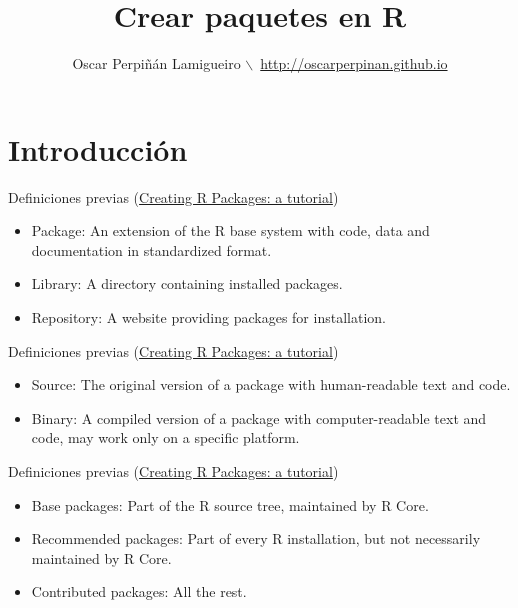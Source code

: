 \documentclass[xcolor={usenames,svgnames,dvipsnames}]{beamer}
\author{Oscar Perpiñán Lamigueiro $\backslash$\ \url{http://oscarperpinan.github.io}}
\date{}
\title{Crear paquetes en R}
\begin{document}
\maketitle


\section{Introducción}
\label{sec:org985fe1c}

\begin{frame}[label={sec:org268fdd0}]{Definiciones previas (\href{http://cran.r-project.org/doc/contrib/Leisch-CreatingPackages.pdf}{Creating R Packages: a tutorial})}
\begin{itemize}
\item \alert{Package}: An extension of the R base system with code, data and
documentation in standardized format.
\item \alert{Library}: A directory containing installed packages.
\item \alert{Repository}: A website providing packages for installation.
\end{itemize}
\end{frame}

\begin{frame}[label={sec:org938644a}]{Definiciones previas (\href{http://cran.r-project.org/doc/contrib/Leisch-CreatingPackages.pdf}{Creating R Packages: a tutorial})}
\begin{itemize}
\item \alert{Source}: The original version of a package with human-readable text and code.
\item \alert{Binary}: A compiled version of a package with computer-readable
text and code, may work only on a specific platform.
\end{itemize}
\end{frame}

\begin{frame}[label={sec:orgb052889}]{Definiciones previas (\href{http://cran.r-project.org/doc/contrib/Leisch-CreatingPackages.pdf}{Creating R Packages: a tutorial})}
\begin{itemize}
\item \alert{Base packages}: Part of the R source tree, maintained by R Core.
\item \alert{Recommended packages}: Part of every R installation, but not
necessarily maintained by R Core.
\item \alert{Contributed packages}: All the rest.
\end{itemize}
\end{frame}
\end{document}
